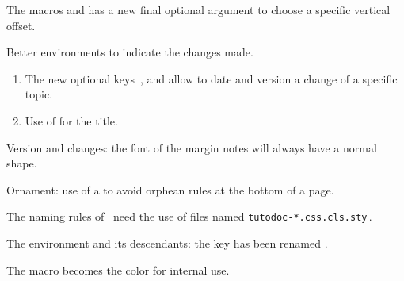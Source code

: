 \tdocsep




\begin{tdocnew}[version = 1.6.2, date = 2024-10-30]
	\item The macros  and  has a new final optional argument  to choose a specific vertical offset.

	\item Better environments to indicate the changes made.
	\begin{enumerate}
        \item The new optional keys \,,  and  allow to date and version a change of a specific topic.

        \item Use of  for the title.
	\end{enumerate}
\end{tdocnew}


\begin{tdocupdate}
	\item Version and changes: the font of the margin notes will always have a normal shape.

	\item Ornament: use of a \tdoclatexin{\cleaders} to avoid orphean rules at the bottom of a page.
\end{tdocupdate}

\tdocsep




\begin{tdoctech}[version = 1.6.1, date = 2024-10-28]
    \item The naming rules of \ctan\ need the use of  files named \verb+tutodoc-*.css.cls.sty+\,.
\end{tdoctech}

\tdocsep




\begin{tdocbreak}[version = 1.6.0, date = 2024-10-27]
    \item The  environment and its descendants: the  key has been renamed .

    \item The macro  becomes the color  for internal use.
\end{tdocbreak}


